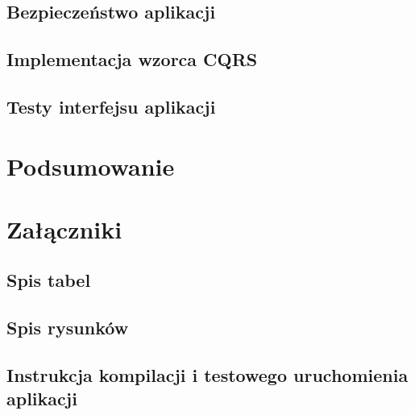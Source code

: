 \section{Bezpieczeństwo aplikacji}
\section{Implementacja wzorca CQRS}
\label{sec:cqrs}
\section{Testy interfejsu aplikacji}
\chapter{Podsumowanie}

 
\chapter*{Załączniki}
\section*{Spis tabel}
\listoftables
\section*{Spis rysunków}
\listoffigures
\lstlistoflistings
{}
\section*{Instrukcja kompilacji i testowego uruchomienia aplikacji}
